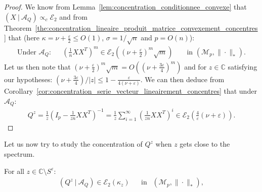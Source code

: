 \documentclass[a4papaer, titlepage]{book}
\begin{document}
\begin{proof}
  We know from Lemma~\ref{lem:concentration_conditionnee_convexe} that $(X \ | \ \mathcal A_Q) \propto_c \mathcal E_2$ and from Theorem~\ref{the:concentration_lineaire_produit_matrice_convexement_concentres} that (here $\kappa = \nu + \frac{\varepsilon}{2} \leq O(1)$, $\sigma = 1/\sqrt n$ and $p= O(n)$):
  \begin{align*}
     \text{Under $\mathcal A_Q$:}&
     &\left(\frac{1}{n}XX^T\right)^m \in \mathcal E_2 \left( \left( \nu + \frac{\varepsilon}{2} \right)^{m} \sqrt m \right)&
    &\text{ in } \left(\mathcal M_{p}, \| \cdot \|_*\right).
   \end{align*}
   Let us then note that $\left(\nu + \frac{\varepsilon}{2} \right)^{m} \sqrt m  = O\left(\left(\nu + \frac{3\varepsilon}{4} \right)^{m}\right)$ and for $z \in \mathbb C$ satisfying our hypotheses: $(\nu + \frac{3\varepsilon}{4})/|z| \leq 1 - \frac{\varepsilon}{4(\nu + \varepsilon)}$.
   We can then deduce from Corollary~\ref{cor:concentration_serie_vecteur_lineairement_concentres} that under $\mathcal A_Q$:
   \begin{align*}
     Q^z = \frac{1}{z} \left(I_p - \frac{1}{zn}XX^T\right)^{-1} = \frac{1}{z}\sum_{i=1}^\infty \left(\frac{1}{zn}XX^T\right)^i \in \mathcal E_2 \left( \frac{4}{\varepsilon} (\nu + \varepsilon )\right).
   \end{align*}
\end{proof}
Let us now try to study the concentration of $Q^z$ when $z$ gets close to the spectrum.
\begin{proposition}\label{pro:Concentration_lineaire_Q_proche_spectre}
  For all $z \in \mathbb C \setminus S^ \varepsilon$:
  \begin{align*}
    (Q^z \ | \ \mathcal A_Q) \in \mathcal E_2(\kappa_z)&
    &\text{in } \ \ (\mathcal{M}_{p}, \|\cdot \|_*),
  \end{align*}
\end{proposition}
\end{document}
